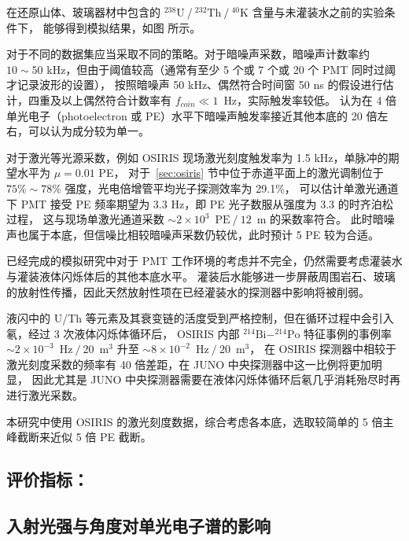 在还原山体、玻璃器材中包含的 $^{238}\text{U}\ /\ ^{232}\text{Th}\ /\ ^{40}\text{K}$ 含量与未灌装水之前的实验条件下，
能够得到模拟结果，如图 所示。

对于不同的数据集应当采取不同的策略。对于暗噪声采数，暗噪声计数率约 $10\sim50$ kHz，但由于阈值较高（通常有至少 5 个或 7 个或 20 个 PMT 同时过阈才记录波形的设置），
按照暗噪声 50 kHz、偶然符合时间窗 50 ns 的假设进行估计，四重及以上偶然符合计数率有 $f_{coin}\ll1\enspace\text{Hz}$，实际触发率较低。
认为在 4 倍单光电子（photoelectron 或 PE）水平下暗噪声触发率接近其他本底的 20 倍左右，可以认为成分较为单一。

对于激光等光源采数，例如 OSIRIS 现场激光刻度触发率为 1.5 kHz，单脉冲的期望水平为 $\mu=0.01$ PE\cite{junocollaborationDesignSensitivityJUNO2021}，
对于~\ref{sec:osiris} 节中位于赤道平面上的激光调制位于 $75\%\sim78\%$ 强度，光电倍增管平均光子探测效率为 29.1\%\cite{JUNOPhysicsDetector2022}，
可以估计单激光通道下 PMT 接受 PE 频率期望为 3.3 Hz，即 PE 光子数服从强度为 3.3 的时齐泊松过程，
这与现场单激光通道采数 $\sim2\times10^{3}\enspace\text{PE}\ /\ 12\enspace\text{m}$ 的采数率符合。
此时暗噪声也属于本底，但信噪比相较暗噪声采数仍较优，此时预计 5 PE 较为合适。

已经完成的模拟研究中对于 PMT 工作环境的考虑并不完全，仍然需要考虑灌装水与灌装液体闪烁体后的其他本底水平。
灌装后水能够进一步屏蔽周围岩石、玻璃的放射性传播，因此天然放射性项在已经灌装水的探测器中影响将被削弱。

液闪中的 U/Th 等元素及其衰变链的活度受到严格控制，但在循环过程中会引入氡，经过 3 次液体闪烁体循环后，
OSIRIS 内部 $^{214}\text{Bi}-^{214}\text{Po}$ 特征事例的事例率 $\sim2\times10^{-3}\enspace\text{Hz}\ /\ 20\enspace\text{m}^3$ 
升至 $\sim8\times10^{-2}\enspace\text{Hz}\ /\ 20\enspace\text{m}^3$，
在 OSIRIS 探测器中相较于激光刻度采数的频率有 40 倍差距，在 JUNO 中央探测器中这一比例将更加明显，
因此尤其是 JUNO 中央探测器需要在液体闪烁体循环后氡几乎消耗殆尽时再进行激光采数。

本研究中使用 OSIRIS 的激光刻度数据，综合考虑各本底，选取较简单的 5 倍主峰截断来近似 5 倍 PE 截断。

\subsection{评价指标：}

\subsection{入射光强与角度对单光电子谱的影响}
